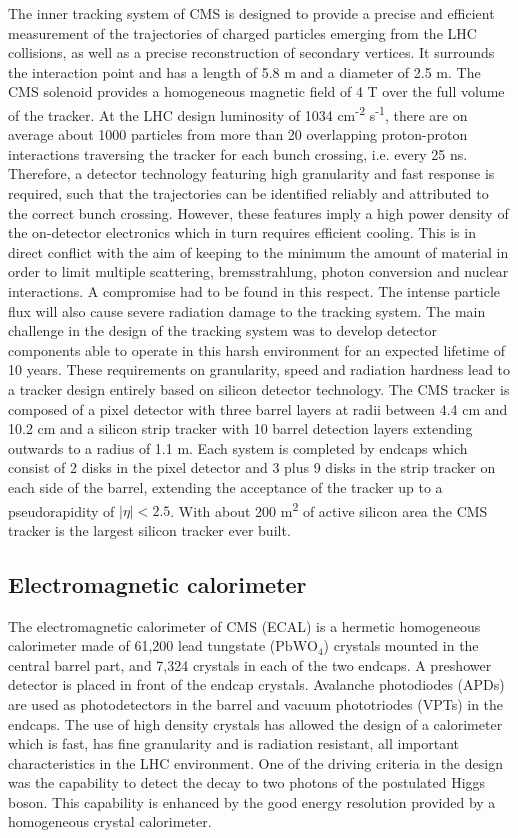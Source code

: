 The inner tracking system of CMS is designed to provide a precise and efficient measurement
of the trajectories of charged particles emerging from the LHC collisions, as well as a precise
reconstruction of secondary vertices. It surrounds the interaction point and has a length of 5.8 m
and a diameter of 2.5 m. The CMS solenoid provides a homogeneous magnetic field of 4 T over
the full volume of the tracker.
At the LHC design luminosity of 1034 cm\textsuperscript{-2} s\textsuperscript{-1},
there are on average about 1000 particles from more than 20 overlapping proton-proton interactions traversing
the tracker for each bunch crossing, i.e. every 25 ns. Therefore, a detector technology featuring high
granularity and fast response is required, such that the trajectories can be identified reliably and
attributed to the correct bunch crossing. However, these features imply a high power density of
the on-detector electronics which in turn requires efficient cooling. This is in direct conflict with
the aim of keeping to the minimum the amount of material in order to limit multiple scattering,
bremsstrahlung, photon conversion and nuclear interactions. A compromise had to be found in this
respect. The intense particle flux will also cause severe radiation damage to the tracking system.
The main challenge in the design of the tracking system was to develop detector components able
to operate in this harsh environment for an expected lifetime of 10 years. These requirements on
granularity, speed and radiation hardness lead to a tracker design entirely based on silicon detector
technology. The CMS tracker is composed of a pixel detector with three barrel layers at radii
between 4.4 cm and 10.2 cm and a silicon strip tracker with 10 barrel detection layers extending
outwards to a radius of 1.1 m. Each system is completed by endcaps which consist of 2 disks in
the pixel detector and 3 plus 9 disks in the strip tracker on each side of the barrel, extending the
acceptance of the tracker up to a pseudorapidity of $|\eta| < 2.5$. With about 200 m\textsuperscript{2} of active silicon
area the CMS tracker is the largest silicon tracker ever built.

\subsection{Electromagnetic calorimeter}
The electromagnetic calorimeter of CMS (ECAL) is a hermetic homogeneous calorimeter made of
61,200 lead tungstate ($\textrm{PbWO}_{\textrm{4}}$) crystals mounted in the central barrel part,
and 7,324 crystals in each of the two endcaps. 
A preshower detector is placed in front of the endcap crystals.
Avalanche photodiodes (APDs) are used as photodetectors in the barrel and vacuum phototriodes
(VPTs) in the endcaps. The use of high density crystals has allowed the design of a calorimeter
which is fast, has fine granularity and is radiation resistant, all important characteristics in the LHC
environment. 
One of the driving criteria in the design was the capability to detect the decay to two
photons of the postulated Higgs boson.
This capability is enhanced by the good energy resolution
provided by a homogeneous crystal calorimeter.


